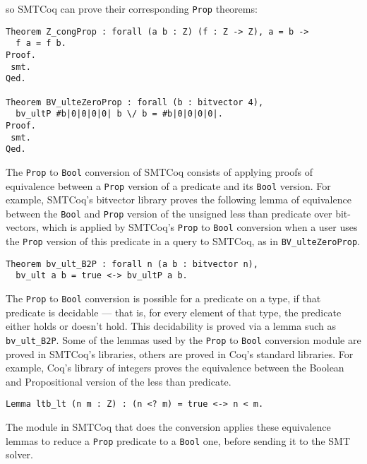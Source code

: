 \documentclass{article}
\begin{document}
	so SMTCoq can prove their 
	corresponding \texttt{Prop}
	theorems:
\begin{verbatim}
Theorem Z_congProp : forall (a b : Z) (f : Z -> Z), a = b -> 
  f a = f b.
Proof.
 smt.
Qed.

Theorem BV_ulteZeroProp : forall (b : bitvector 4), 
  bv_ultP #b|0|0|0|0| b \/ b = #b|0|0|0|0|.
Proof.
 smt.
Qed.
\end{verbatim}
	The	\texttt{Prop} to \texttt{Bool} 
	conversion of SMTCoq consists of 
	applying proofs of equivalence 
	between a \texttt{Prop} version
	of a predicate and its \texttt{Bool}
	version. For example, SMTCoq's 
	bitvector library proves the 
	following lemma of equivalence 
	between the \texttt{Bool}
	and \texttt{Prop} version of the 
	unsigned less than predicate over
	bit-vectors, which is applied 
	by SMTCoq's \texttt{Prop} to 
	\texttt{Bool} conversion when 
	a user uses the \texttt{Prop}
	version of this predicate in a 
	query to SMTCoq, as in 
	\texttt{BV\_ulteZeroProp}.
\begin{verbatim}
Theorem bv_ult_B2P : forall n (a b : bitvector n), 
  bv_ult a b = true <-> bv_ultP a b.
\end{verbatim}
	The \texttt{Prop} to \texttt{Bool}
	conversion is possible for a predicate 
	on a type, if that predicate is 
	decidable --- that is, for every 
	element of that type, the predicate 
	either holds or doesn't hold. This 
	decidability is proved via a lemma 
	such as \texttt{bv\_ult\_B2P}. Some
	of the lemmas used by the 
	\texttt{Prop} to \texttt{Bool} 
	conversion module are proved in SMTCoq's
	libraries, others are proved in 
	Coq's standard libraries. For 
	example, Coq's library of integers
	proves the equivalence between the 
	Boolean and Propositional version 
	of the less than predicate.
\begin{verbatim}
Lemma ltb_lt (n m : Z) : (n <? m) = true <-> n < m.
\end{verbatim}
	The module in SMTCoq that does
	the conversion applies these 
	equivalence lemmas to reduce a 
	\texttt{Prop} predicate to a 
	\texttt{Bool} one, before sending 
	it to the SMT solver.
\end{document}
